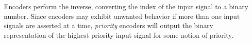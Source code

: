 \documentclass[8pt]{article}
\begin{document}
\begin{center}
\begin{tikzpicture}



    \end{tikzpicture}
\end{center}
Encoders perform the inverse, converting the index of the input signal
to a binary number. Since encoders may exhibit unwanted behavior if more than
one input signals are asserted at a time, \emph{priority} encoders will output
the binary representation of the highest-priority input signal for some
notion of priority.
\end{document}
